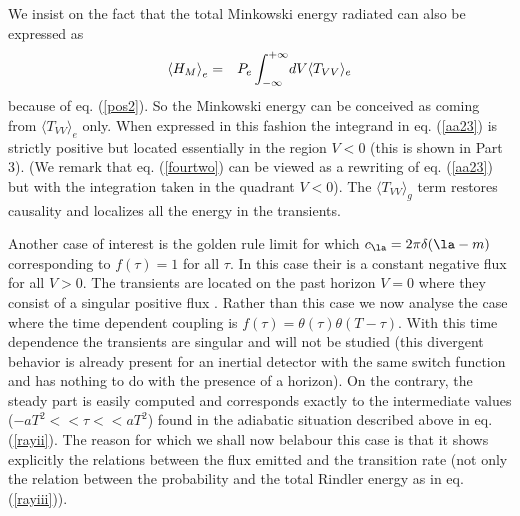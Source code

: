 We insist on the fact that
the total Minkowski energy radiated can also be expressed as
\begin{eqnarray}
\mbox{$ \langle H_M \rangle $}_e &=& P_e \int^{+\infty}_{-\infty} \! dV\langle T_{VV} \rangle_e
\label{aa23}
\end{eqnarray}
because of eq. (\ref{pos2}).
So the Minkowski energy can be conceived as coming from
$\langle T_{VV} \rangle_e$ only. When expressed in this fashion the integrand
in eq. (\ref{aa23}) is strictly positive but located essentially in the region
$ V<0$ (this is shown in Part 3). (We remark that eq. (\ref{fourtwo}) can be
viewed as a rewriting of eq. (\ref{aa23}) but with the integration taken
in the quadrant $V<0$). The  $\langle T_{VV} \rangle_g$ term  restores
causality and localizes all the energy in the transients.

Another case of interest is the golden rule limit for which $c_\la = 2 \pi
\delta(\la-m)$ corresponding to $f(\tau) =1$ for all $\tau$. In this case
their is a constant negative flux for all $V>0$. The transients are located on
the past horizon $V=0$ where they consist of a singular positive flux
\cite{Unru2}. Rather
than this case
we
now analyse the case where the time dependent coupling is
$f(\tau) = \theta(\tau) \theta (T - \tau)$. With this time dependence the
transients are  singular and will not be studied
(this divergent behavior is already
present for an inertial detector with the same switch function and has
nothing to do with the presence of a horizon). On
the contrary, the steady part is easily computed and corresponds exactly to
the intermediate values ($- aT^2  << \tau << a T^2   $)
found in the adiabatic situation described
above in eq. (\ref{rayii}). The reason for which we shall now belabour this
case is that it shows
explicitly the  relations between the
flux emitted and the  transition rate (not only the relation
between the probability and the
total Rindler energy as in
eq. (\ref{rayiii})).

